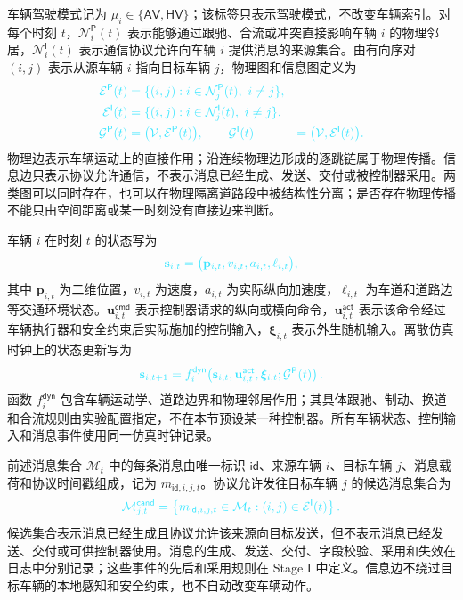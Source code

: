 \documentclass[10pt,a4paper,twocolumn]{article}
\newcommand{\revBlue}[1]{#1}
\begin{document}
\revBlue{车辆驾驶模式记为 $\mu_i\in\{\mathsf{AV},\mathsf{HV}\}$；该标签只表示驾驶模式，不改变车辆索引。对每个时刻 $t$，$\mathcal{N}_i^{\mathsf P}(t)$ 表示能够通过跟驰、合流或冲突直接影响车辆 $i$ 的物理邻居，$\mathcal{N}_i^{\mathsf I}(t)$ 表示通信协议允许向车辆 $i$ 提供消息的来源集合。由有向序对 $(i,j)$ 表示从源车辆 $i$ 指向目标车辆 $j$，物理图和信息图定义为}
\begin{equation}
\color{advisorBlue}
\begin{aligned}
\mathcal{E}^{\mathsf P}(t)&=\{(i,j):i\in\mathcal{N}_j^{\mathsf P}(t),\ i\neq j\},\\
\mathcal{E}^{\mathsf I}(t)&=\{(i,j):i\in\mathcal{N}_j^{\mathsf I}(t),\ i\neq j\},\\
\mathcal{G}^{\mathsf P}(t)&=\bigl(\mathcal{V},\mathcal{E}^{\mathsf P}(t)\bigr),\qquad
\mathcal{G}^{\mathsf I}(t)&=\bigl(\mathcal{V},\mathcal{E}^{\mathsf I}(t)\bigr).
\end{aligned}
\end{equation}
物理边表示车辆运动上的直接作用；沿连续物理边形成的逐跳链属于物理传播。信息边只表示协议允许通信，不表示消息已经生成、发送、交付或被控制器采用。两类图可以同时存在，也可以在物理隔离道路段中被结构性分离；是否存在物理传播不能只由空间距离或某一时刻没有直接边来判断。

车辆 $i$ 在时刻 $t$ 的状态写为
\begin{equation}
\color{advisorBlue}
\mathbf s_{i,t}=\bigl(\mathbf p_{i,t},v_{i,t},a_{i,t},\ell_{i,t}\bigr),
\end{equation}
其中 $\mathbf p_{i,t}$ 为二维位置，$v_{i,t}$ 为速度，$a_{i,t}$ 为实际纵向加速度，$\ell_{i,t}$ 为车道和道路边等交通环境状态。$\mathbf u_{i,t}^{\mathsf{cmd}}$ 表示控制器请求的纵向或横向命令，$\mathbf u_{i,t}^{\mathsf{act}}$ 表示该命令经过车辆执行器和安全约束后实际施加的控制输入，$\boldsymbol\xi_{i,t}$ 表示外生随机输入。离散仿真时钟上的状态更新写为
\begin{equation}
\color{advisorBlue}
\mathbf s_{i,t+1}=f_i^{\mathsf{dyn}}\!\left(\mathbf s_{i,t},\mathbf u_{i,t}^{\mathsf{act}},\boldsymbol\xi_{i,t};\mathcal G^{\mathsf P}(t)\right).
\end{equation}
函数 $f_i^{\mathsf{dyn}}$ 包含车辆运动学、道路边界和物理邻居作用；其具体跟驰、制动、换道和合流规则由实验配置指定，不在本节预设某一种控制器。所有车辆状态、控制输入和消息事件使用同一仿真时钟记录。

前述消息集合 $\mathcal M_t$ 中的每条消息由唯一标识 $\mathsf{id}$、来源车辆 $i$、目标车辆 $j$、消息载荷和协议时间戳组成，记为 $m_{\mathsf{id},i,j,t}$。协议允许发往目标车辆 $j$ 的候选消息集合为
\begin{equation}
\color{advisorBlue}
\mathcal M_{j,t}^{\mathsf{cand}}=\left\{m_{\mathsf{id},i,j,t}\in \mathcal M_t:
(i,j)\in\mathcal{E}^{\mathsf I}(t)\right\}.
\end{equation}
候选集合表示消息已经生成且协议允许该来源向目标发送，但不表示消息已经发送、交付或可供控制器使用。消息的生成、发送、交付、字段校验、采用和失效在日志中分别记录；这些事件的先后和采用规则在 Stage I 中定义。信息边不绕过目标车辆的本地感知和安全约束，也不自动改变车辆动作。
\end{document}
